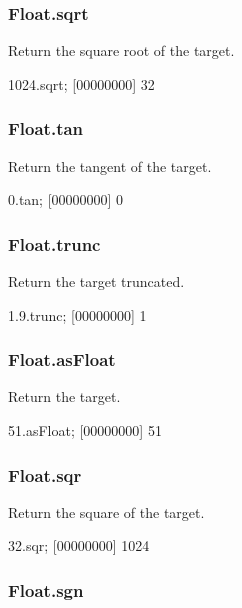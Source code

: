 \subsubsection{Float.sqrt}

Return the square root of the target.

\begin{urbiscript}
1024.sqrt;
[00000000] 32
\end{urbiscript}

\subsubsection{Float.tan}

Return the tangent of the target.

\begin{urbiscript}[caption=Float.tan, label=lst:float-tan]
0.tan;
[00000000] 0
\end{urbiscript}

\subsubsection{Float.trunc}

Return the target truncated.

\begin{urbiscript}
1.9.trunc;
[00000000] 1
\end{urbiscript}

\subsubsection{Float.asFloat}

Return the target.

\begin{urbiscript}
51.asFloat;
[00000000] 51
\end{urbiscript}

\subsubsection{Float.sqr}

Return the square of the target.

\begin{urbiscript}
32.sqr;
[00000000] 1024
\end{urbiscript}

\subsubsection{Float.sgn}

